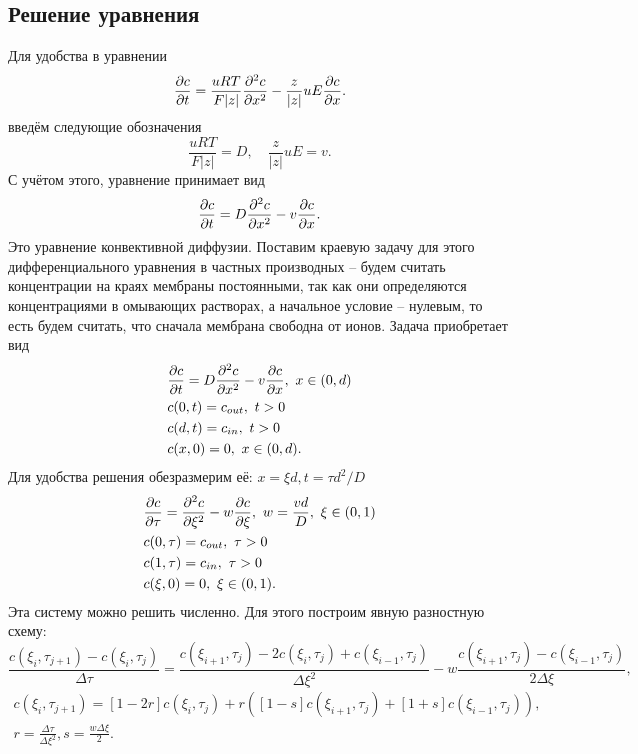 \subsection{Решение уравнения}
    Для удобства в уравнении
    \[
        \frac{\partial c}{\partial t} = \frac{uRT}{F|z|}\frac{\partial^2 c}{\partial {x}^2} -
            \frac{z}{|z|}uE\frac{\partial c}{\partial x}.
    \]
    введём следующие обозначения
    \[
        \frac{uRT}{F|z|} = D,\quad \frac{z}{|z|}uE = v.
    \]
    С учётом этого, уравнение принимает вид
    \[
        \frac{\partial c}{\partial t} = D\frac{\partial^2 c}{\partial {x}^2} - v\frac{\partial c}{\partial x}.
    \]
    Это уравнение конвективной диффузии. Поставим краевую задачу для
    этого дифференциального уравнения в частных производных -- будем
    считать концентрации на краях мембраны постоянными, так как они
    определяются концентрациями в омывающих растворах, а начальное
    условие -- нулевым, то есть будем считать, что сначала мембрана
    свободна от ионов. Задача приобретает вид
    \begin{align*}
        & \frac{\partial c}{\partial t} = D\frac{\partial^2 c}{\partial {x}^2} - v\frac{\partial c}{\partial x},\ x\in(0,d)\\
        & c(0, t) = c_{out},\ t>0 \\
        & c(d, t) = c_{in},\ t>0 \\
        & c(x, 0) = 0,\ x\in(0,d).
    \end{align*}
    Для удобства решения обезразмерим её:
    \( x = \xi d, t = \tau d^2 / D \)
    \begin{align*}
        & \frac{\partial c}{\partial \tau} = \frac{\partial^2 c}{\partial {\xi}^2} -
            w\frac{\partial c}{\partial \xi},\ w = \frac{vd}{D},\ \xi\in(0,1) \\
        & c(0, \tau) = c_{out},\ \tau>0 \\
        & c(1, \tau) = c_{in},\ \tau>0 \\
        & c(\xi, 0) = 0,\ \xi\in(0,1).
    \end{align*}
    Эта систему можно решить численно. Для этого построим явную разностную
    схему:
    \[
        \frac{c(\xi_i,\tau_{j+1}) - c(\xi_i, \tau_j)}{\Delta\tau} =
        \frac{c(\xi_{i+1},\tau_j) - 2c(\xi_i, \tau_j) +
        c(\xi_{i-1},\tau_j)}{\Delta\xi^2} -
        w\frac{c(\xi_{i+1},\tau_j) - c(\xi_{i-1}, \tau_j)}{2\Delta\xi},
    \]
    \begin{gather*}
        c(\xi_i,\tau_{j+1}) =
        [1-2r]c(\xi_i, \tau_j) +
        r\left(
            [1 - s]c(\xi_{i+1},\tau_j) + [1 + s]c(\xi_{i-1},\tau_j)
        \right),\\
        r = \frac{\Delta\tau}{\Delta\xi^2}, s = \frac{w\Delta\xi}{2}.
    \end{gather*}
